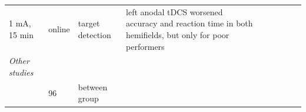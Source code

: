 \documentclass[11pt,]{memoir}
\begin{document}
\begin{longtable}[]{@{}lllllllll@{}}
\begin{minipage}[t]{0.05\columnwidth}
1 mA, 15
min\strut
\end{minipage} & \begin{minipage}[t]{0.05\columnwidth}\raggedright
online\strut
\end{minipage} & \begin{minipage}[t]{0.11\columnwidth}\raggedright
target detection\strut
\end{minipage} & \begin{minipage}[t]{0.24\columnwidth}\raggedright
left anodal tDCS worsened accuracy and reaction time in both
hemifields, but only for poor performers\strut
\end{minipage}\tabularnewline
\begin{minipage}[t]{0.12\columnwidth}\raggedright
\emph{Other studies}\strut
\end{minipage} & \begin{minipage}[t]{0.02\columnwidth}\raggedright
\strut
\end{minipage} & \begin{minipage}[t]{0.04\columnwidth}\raggedright
\strut
\end{minipage} & \begin{minipage}[t]{0.11\columnwidth}\raggedright
\strut
\end{minipage} & \begin{minipage}[t]{0.03\columnwidth}\raggedright
\strut
\end{minipage} & \begin{minipage}[t]{0.05\columnwidth}\raggedright
\strut
\end{minipage} & \begin{minipage}[t]{0.05\columnwidth}\raggedright
\strut
\end{minipage} & \begin{minipage}[t]{0.11\columnwidth}\raggedright
\strut
\end{minipage} & \begin{minipage}[t]{0.24\columnwidth}\raggedright
\strut
\end{minipage}\tabularnewline
\begin{minipage}[t]{0.12\columnwidth}\raggedright
\textcite{Brignani2013}\strut
\end{minipage} & \begin{minipage}[t]{0.02\columnwidth}\raggedright
96\strut
\end{minipage} & \begin{minipage}[t]{0.04\columnwidth}\raggedright
between
group\strut
\end{minipage} & \begin{minipage}[t]{0.11\columnwidth}\raggedright

\end{minipage}
\end{longtable}
\end{document}
